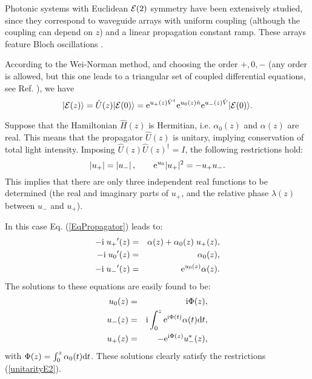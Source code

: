 \documentclass[12pt]{iopart}
\newcommand{\ket}[1]{ |#1\rangle}
\begin{document}
Photonic systems with Euclidean ${\cal E}(2)$ symmetry have been extensively studied, since they correspond to waveguide arrays with uniform coupling (although the coupling can depend on $z$) and a linear propagation constant ramp. These arrays feature Bloch oscillations \cite{Bessel}.


According to the Wei-Norman method, and choosing the order  $+,0,-$ (any order is allowed, but this one leads to a triangular set of coupled differential equations, see Ref. \cite{Wei-Norman-order}), we have
\begin{equation}
\ket{{\cal E}(z)}=\hat{U}(z)\ket{{\cal E}(0)}
={\rm e}^{ u_+(z)\hat{V}^\dag}  {\rm e}^{ u_0(z)\hat{n}}{\rm e}^{ u_-(z)\hat{V}}  \ket{{\cal E}(0)}.
\label{E2}
\end{equation}


Suppose that the Hamiltonian $\hat{H}(z)$ is Hermitian, i.e. $\alpha_0(z)$ and $\alpha(z)$ are
real. This means that the
propagator $\hat{U}(z)$ is unitary, implying conservation of total light
intensity. Imposing $\hat{U}(z)\hat{U}(z)^\dag=I$, the following restrictions
hold:
%
\begin{equation}
|u_+|=|u_-|\,,\qquad
{\rm e}^{u_0}|u_+|^2=-u_+ u_- .
\label{unitarityE2}
\end{equation}
%
%
This implies that there are only three independent real functions to be determined (the real and imaginary parts
of $u_+$, and the relative phase $\lambda(z)$ between $u_-$ and $u_+$).

In this case Eq. (\ref{EqPropagator}) leads to:
%
\begin{eqnarray}
-{\rm i}\; {u_+}'(z)&=&\alpha(z)+\alpha_0(z) \; u_+(z) ,  \nonumber\\
-{\rm i}\; {u_0}'(z)&=&\alpha_0(z)  , \\
-{\rm i}\; {u_-}'(z)&=& {\rm e}^{u_0(z)}\alpha(z)\nonumber .
\end{eqnarray}
%
The solutions to these equations are easily found to be:
%
\begin{eqnarray}
u_0(z)&=& {\rm i} \Phi(z), \nonumber\\
u_-(z) &=&  {\rm i}  \int_0^z {\rm e}^{{\rm i} \Phi(t)}\alpha(t){\rm d}t, \\
u_+(z) &=& -  {\rm e}^{{\rm i} \Phi(z)} u_-^*(z), \nonumber
\end{eqnarray}
%
with $\Phi(z)=\int_0^z \alpha_0(t){\rm d}t$. These solutions clearly satisfy the restrictions (\ref{unitarityE2}).
\end{document}
